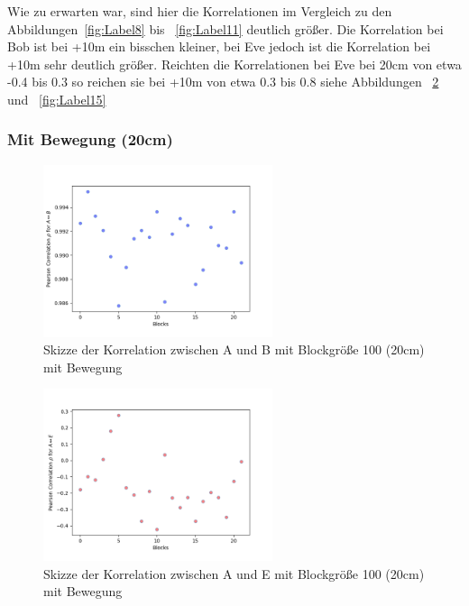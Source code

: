 \documentclass[12pt,a4paper]{article}
\begin{document}
Wie zu erwarten war, sind hier die Korrelationen im 
Vergleich zu den Abbildungen~\ref{fig:Label8} bis
~\ref{fig:Label11} deutlich größer. Die Korrelation bei 
Bob ist bei +10m ein bisschen kleiner, bei Eve jedoch ist 
die Korrelation bei +10m sehr deutlich größer. Reichten die 
Korrelationen bei Eve bei 20cm von etwa -0.4 bis 0.3 so 
reichen sie bei +10m von etwa 0.3 bis 0.8 siehe Abbildungen
~\ref{fig:Label13} und ~\ref{fig:Label15} 



\subsubsection*{Mit Bewegung (20cm)}


\begin{figure}[hbt!]
	\centering
		\includegraphics[width=0.6\textwidth ]
		{Bilder/a3-t3a-mb-block100-correlation-AB.png}
		\caption{Skizze der Korrelation zwischen A und B mit Blockgröße 100 (20cm) mit Bewegung}
		\label{fig:Label12}
\end{figure}

\begin{figure}[hbt!]
	\centering
		\includegraphics[width=0.6\textwidth ]
		{Bilder/a3-t3a-mb-block100-correlation-AE.png}
		\caption{Skizze der Korrelation zwischen A und E mit Blockgröße 100 (20cm) mit Bewegung}
		\label{fig:Label13}
\end{figure}
\clearpage
\end{document}
